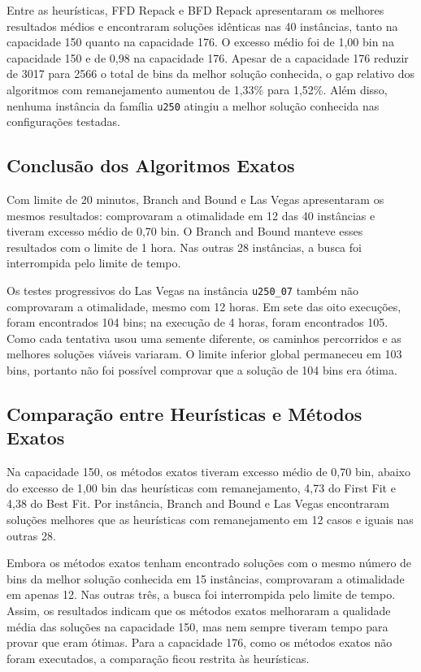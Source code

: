 \documentclass[12pt]{article}
\begin{document}
Entre as heurísticas, FFD Repack e BFD Repack apresentaram os melhores resultados médios e encontraram soluções idênticas nas 40 instâncias, tanto na capacidade 150 quanto na capacidade 176. O excesso médio foi de 1,00 bin na capacidade 150 e de 0,98 na capacidade 176. Apesar de a capacidade 176 reduzir de 3017 para 2566 o total de bins da melhor solução conhecida, o gap relativo dos algoritmos com remanejamento aumentou de 1,33\% para 1,52\%. Além disso, nenhuma instância da família \texttt{u250} atingiu a melhor solução conhecida nas configurações testadas.

\subsection{Conclusão dos Algoritmos Exatos}

Com limite de 20 minutos, Branch and Bound e Las Vegas apresentaram os mesmos resultados: comprovaram a otimalidade em 12 das 40 instâncias e tiveram excesso médio de 0,70 bin. O Branch and Bound manteve esses resultados com o limite de 1 hora. Nas outras 28 instâncias, a busca foi interrompida pelo limite de tempo.

Os testes progressivos do Las Vegas na instância \texttt{u250\_07} também não comprovaram a otimalidade, mesmo com 12 horas. Em sete das oito execuções, foram encontrados 104 bins; na execução de 4 horas, foram encontrados 105. Como cada tentativa usou uma semente diferente, os caminhos percorridos e as melhores soluções viáveis variaram. O limite inferior global permaneceu em 103 bins, portanto não foi possível comprovar que a solução de 104 bins era ótima.

\subsection{Comparação entre Heurísticas e Métodos Exatos}

Na capacidade 150, os métodos exatos tiveram excesso médio de 0,70 bin, abaixo do excesso de 1,00 bin das heurísticas com remanejamento, 4,73 do First Fit e 4,38 do Best Fit. Por instância, Branch and Bound e Las Vegas encontraram soluções melhores que as heurísticas com remanejamento em 12 casos e iguais nas outras 28.

Embora os métodos exatos tenham encontrado soluções com o mesmo número de bins da melhor solução conhecida em 15 instâncias, comprovaram a otimalidade em apenas 12. Nas outras três, a busca foi interrompida pelo limite de tempo. Assim, os resultados indicam que os métodos exatos melhoraram a qualidade média das soluções na capacidade 150, mas nem sempre tiveram tempo para provar que eram ótimas. Para a capacidade 176, como os métodos exatos não foram executados, a comparação ficou restrita às heurísticas.



\end{document}

